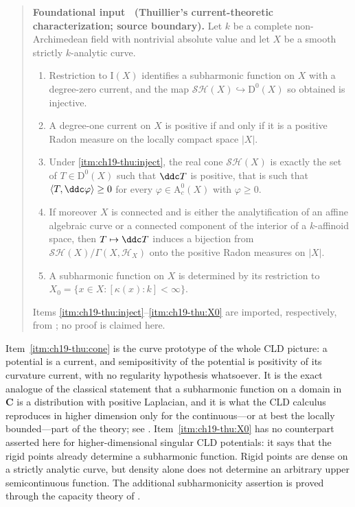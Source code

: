 \label{thm:ch19-thuillier-sh-currents}
\begin{quote}
\textbf{Foundational input \thetheorem\ (Thuillier's current-theoretic
characterization; source boundary).}
Let $k$ be a complete non-Archimedean field with nontrivial absolute value
and let $X$ be a smooth strictly $k$-analytic curve.
\begin{enumerate}
\item\label{itm:ch19-thu:inject}
Restriction to $\mathrm I(X)$ identifies a subharmonic function on $X$
with a degree-zero current, and the map
$\mathcal{SH}(X)\hookrightarrow\mathrm D^0(X)$ so obtained is injective.
\item\label{itm:ch19-thu:measures}
A degree-one current on $X$ is positive if and only if it is a positive
Radon measure on the locally compact space $|X|$.
\item\label{itm:ch19-thu:cone}
Under \cref{itm:ch19-thu:inject}, the real cone $\mathcal{SH}(X)$ is exactly
the set of $T\in\mathrm D^0(X)$ such that $\ddc T$ is positive, that is
such that $\langle T,\ddc\varphi\rangle\geq0$ for every
$\varphi\in\mathrm A^0_c(X)$ with $\varphi\geq0$.
\item\label{itm:ch19-thu:bijection}
If moreover $X$ is connected and is either the analytification of an affine
algebraic curve or a connected component of the interior of a $k$-affinoid
space, then $T\mapsto\ddc T$ induces a bijection from
$\mathcal{SH}(X)/\Gamma(X,\mathcal H_X)$ onto the positive Radon measures
on $|X|$.
\item\label{itm:ch19-thu:X0}
A subharmonic function on $X$ is determined by its restriction to
$X_0=\{x\in X:[\kappa(x):k]<\infty\}$.
\end{enumerate}
Items \cref{itm:ch19-thu:inject}--\cref{itm:ch19-thu:X0} are imported,
respectively, from \cite[Lem.~3.4.1, Thm.~3.4.12, Cor.~3.4.13,
Thm.~3.6.26]{Thu05}; no proof is claimed here.
\end{quote}

Item~\cref{itm:ch19-thu:cone} is the curve prototype of the whole CLD
picture: a potential is a current, and semipositivity of the potential is
positivity of its curvature current, with no regularity hypothesis
whatsoever.  It is the exact analogue of the classical statement that a
subharmonic function on a domain in $\mathbf C$ is a distribution with
positive Laplacian, and it is what the CLD calculus reproduces in higher
dimension only for the continuous---or at best the locally bounded---part of
the theory; see .  Item~\cref{itm:ch19-thu:X0} has
no counterpart asserted here for higher-dimensional singular CLD potentials:
it says that the rigid points already determine a subharmonic function.
Rigid points are dense on a strictly analytic curve, but density alone does
not determine an arbitrary upper semicontinuous function.  The additional
subharmonicity assertion is proved through the capacity theory of
\cite[\S3.6]{Thu05}.


